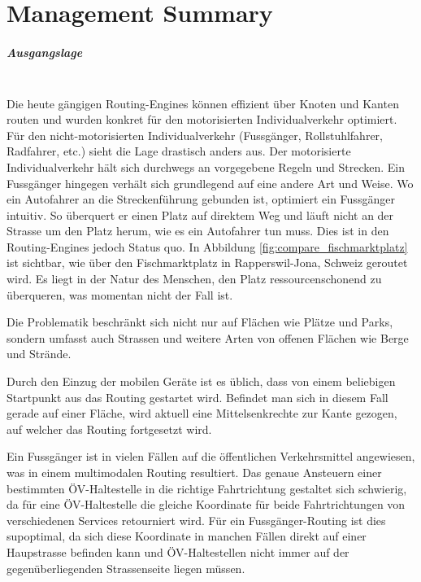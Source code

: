 
\chapter*{Management Summary}

\paragraph{Ausgangslage}~\\
Die heute gängigen Routing-Engines können effizient über Knoten und Kanten routen und wurden konkret für den motorisierten Individualverkehr optimiert. Für den nicht-motorisierten Individualverkehr (Fussgänger, Rollstuhlfahrer, Radfahrer, etc.) sieht die Lage drastisch anders aus. Der motorisierte Individualverkehr hält sich durchwegs an vorgegebene Regeln und Strecken. Ein Fussgänger hingegen verhält sich grundlegend auf eine andere Art und Weise. Wo ein Autofahrer an die Streckenführung gebunden ist, optimiert ein Fussgänger intuitiv. So überquert er einen Platz auf direktem Weg und läuft nicht an der Strasse um den Platz herum, wie es ein Autofahrer tun muss. Dies ist in den Routing-Engines jedoch Status quo. In Abbildung \ref{fig:compare_fischmarktplatz} ist sichtbar, wie über den Fischmarktplatz in Rapperswil-Jona, Schweiz geroutet wird. Es liegt in der Natur des Menschen, den Platz ressourcenschonend zu überqueren, was momentan nicht der Fall ist.

Die Problematik beschränkt sich nicht nur auf Flächen wie Plätze und Parks, sondern umfasst auch Strassen und weitere Arten von offenen Flächen wie Berge und Strände.

Durch den Einzug der mobilen Geräte ist es üblich, dass von einem beliebigen Startpunkt aus das Routing gestartet wird. Befindet man sich in diesem Fall gerade auf einer Fläche, wird aktuell eine Mittelsenkrechte zur Kante gezogen, auf welcher das Routing fortgesetzt wird.

Ein Fussgänger ist in vielen Fällen auf die öffentlichen Verkehrsmittel angewiesen, was in einem multimodalen Routing resultiert. Das genaue Ansteuern einer bestimmten ÖV-Haltestelle in die richtige Fahrtrichtung gestaltet sich schwierig, da für eine ÖV-Haltestelle die gleiche Koordinate für beide Fahrtrichtungen von verschiedenen Services retourniert wird. Für ein Fussgänger-Routing ist dies supoptimal, da sich diese Koordinate in manchen Fällen direkt auf einer Haupstrasse befinden kann und ÖV-Haltestellen nicht immer auf der gegenüberliegenden Strassenseite liegen müssen.

